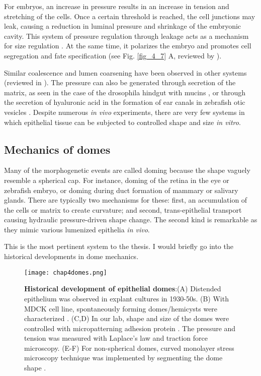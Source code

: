 For embryos, an increase in pressure results in an increase in tension and stretching of the cells. Once a certain threshold is reached, the cell junctions may leak, causing a reduction in luminal pressure and shrinkage of the embryonic cavity. This system of pressure regulation through leakage acts as a mechanism for size regulation \cite{chan2019}. At the same time, it polarizes the embryo and promotes cell segregation and fate specification (see Fig. \ref{fig_4_7} A, reviewed by \cite{chan2020}).

Similar coalescence and lumen coarsening have been observed in other systems (reviewed in \cite{schliffka2019}). The pressure can also be generated through secretion of the matrix, as seen in the case of the drosophila hindgut with mucins \cite{syed2012}, or through the secretion of hyaluronic acid in the formation of ear canals in zebrafish otic vesicles \cite{munjal2021}. Despite numerous
\textit{in vivo} experiments, there are very few systems in which epithelial tissue can be subjected to controlled shape and size \textit{in vitro}.

\hypertarget{mechanics-of-domes}{%
	\subsection{Mechanics of domes}\label{mechanics-of-domes}}

Many of the morphogenetic events are called doming because the shape vaguely resemble a spherical cap. For instance, doming of the retina in the eye or zebrafish embryo, or doming during duct formation of mammary or salivary glands. There are typically two mechanisms for these: first, an accumulation of the cells or matrix to create curvature; and second, trans-epithelial transport causing hydraulic pressure-driven shape change. The second kind is remarkable as they mimic various lumenized epithelia \textit{in vivo}.

This is the most pertinent system to the thesis. I would briefly go into the historical developments in dome mechanics. 

\begin{figure}
	\centering
	\texttt{[image: chap4domes.png]}
	\caption{\label{fig_4_8} \textbf{Historical development of epithelial domes}:(A) Distended epithelium was observed in explant cultures in 1930-50s. (B) With MDCK cell line, spontaneously forming domes/hemicysts were characterized \cite{leighton1969, valentich1979}. (C,D) In our lab, shape and size of the domes were controlled with micropatterning adhesion protein \cite{latorre2018}. The pressure and tension was measured with Laplace's law and traction force microscopy. (E-F) For non-spherical domes, curved monolayer stress microscopy technique was implemented by segmenting the dome shape \cite{marin-llaurado2022}.
	}
\end{figure}
	
